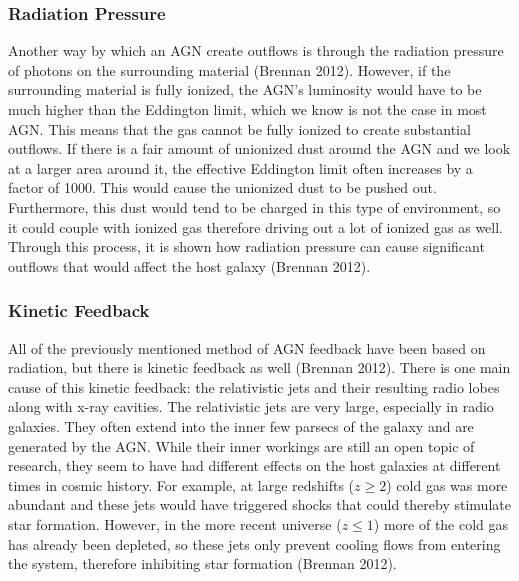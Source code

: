 \documentclass[12pt]{article}
\begin{document}
    \subsubsection{Radiation Pressure}
    Another way by which an AGN create outflows is through the radiation
    pressure of photons on
    the surrounding material (Brennan 2012).  However, if the surrounding material
    is fully
    ionized, the AGN's luminosity would have to be much higher than the
    Eddington limit, which we know is not the case in most AGN.  This means that
    the gas cannot be fully ionized to create substantial outflows.  If there is
    a fair amount of unionized dust around the AGN and we look at a larger area
    around it, the effective Eddington limit often increases by a factor of
    1000.  This would cause the unionized dust to be pushed out.  Furthermore,
    this dust would tend to be charged in this type of environment, so it could
    couple with ionized gas therefore driving out a lot of ionized gas as well.
    Through this process, it is shown how radiation pressure can cause
    significant outflows that would affect the host galaxy (Brennan 2012).

    \subsubsection{Kinetic Feedback}
    All of the previously mentioned method of AGN feedback have been based on
    radiation, but there is kinetic feedback as well (Brennan 2012).  There is
    one main cause
    of this kinetic feedback: the relativistic jets and their resulting
    radio lobes along
    with x-ray cavities.  The relativistic jets are very large,
    especially in radio galaxies.  They often extend into the inner few parsecs
    of the galaxy and are generated by the AGN.  While their inner workings are
    still an open topic of research, they seem to have had different effects on
    the host galaxies at different times in cosmic history.  For example, at
    large redshifts ($z \ge 2$) cold gas was more abundant and these jets would
    have triggered shocks that could thereby stimulate star formation.  However,
    in the more recent universe ($z \le 1$) more of the cold gas has already
    been depleted, so these jets only prevent cooling flows from entering the
    system, therefore inhibiting star formation (Brennan 2012).
\end{document}
